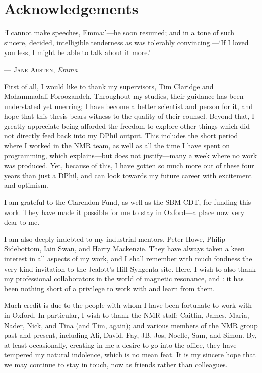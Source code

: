 \chapter{Acknowledgements}

\epigraph{\singlespacing%
`I cannot make speeches, Emma:'---he soon resumed; and in a tone of such sincere, decided, intelligible tenderness as was tolerably convincing.---`If I loved you less, I might be able to talk about it more.'
}{--- \textsc{Jane Austen}, \textit{Emma}}


First of all, I would like to thank my supervisors, Tim Claridge and Mohammadali Foroozandeh.
Throughout my studies, their guidance has been understated yet unerring; I have become a better scientist and person for it, and hope that this thesis bears witness to the quality of their counsel.
Beyond that, I greatly appreciate being afforded the freedom to explore other things which did not directly feed back into my DPhil output.
This includes the short period where I worked in the NMR team, as well as all the time I have spent on programming, which explains---but does not justify---many a week where no work was produced.
Yet, because of this, I have gotten so much more out of these four years than just a DPhil, and can look towards my future career with excitement and optimism.

I am grateful to the Clarendon Fund, as well as the SBM CDT, for funding this work.
They have made it possible for me to stay in Oxford---a place now very dear to me.

I am also deeply indebted to my industrial mentors, Peter Howe, Philip Sidebottom, Iain Swan, and Harry Mackenzie.
They have always taken a keen interest in all aspects of my work, and I shall remember with much fondness the very kind invitation to the Jealott's Hill Syngenta site.
Here, I wish to also thank my professional collaborators in the world of magnetic resonance, \EK{} and \JND{}: it has been nothing short of a privilege to work with and learn from them.

Much credit is due to the people with whom I have been fortunate to work with in Oxford.
In particular, I wish to thank the NMR staff: Caitlin, James, Maria, Nader, Nick, and Tina (and Tim, again); and various members of the NMR group past and present, including Ali, David, Fay, JB, Jos, Noelle, Sam, and Simon.
By, at least occasionally, creating in me a desire to go into the office, they have tempered my natural indolence, which is no mean feat.
It is my sincere hope that we may continue to stay in touch, now as friends rather than colleagues.

